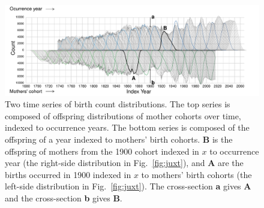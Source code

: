 \documentclass{article}
\begin{document}
\begin{figure}[ht!]
 \centering
        \includegraphics[width=\textwidth]{Figures/FxFlowReflect.pdf}
        \caption{Two time series of birth count distributions. The top series is composed of offspring distributions of mother cohorts over time, indexed to occurrence years. The bottom series is composed of the offspring of a year indexed to mothers' birth cohorts. \textbf{B} is the offspring of mothers from the 1900 cohort indexed in $x$ to occurrence year (the right-side distribution in Fig.~\ref{fig:juxt}), and \textbf{A} are the births occurred in 1900 indexed in $x$ to mothers' birth cohorts (the left-side distribution in Fig.~\ref{fig:juxt}). The cross-section \textbf{a} gives \textbf{A} and the cross-section \textbf{b} gives \textbf{B}.}
          \label{fig:reflect1}
\end{figure}
\end{document}
